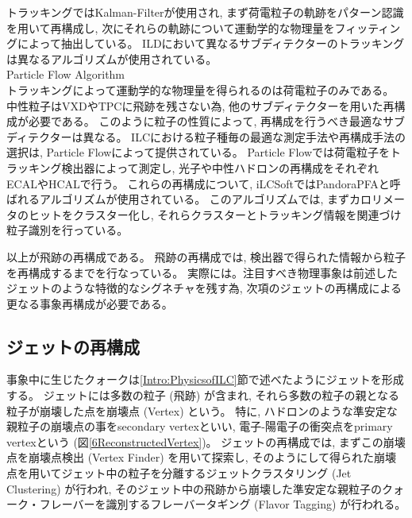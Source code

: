 トラッキングではKalman-Filterが使用され, まず荷電粒子の軌跡をパターン認識を用いて再構成し, 次にそれらの軌跡について運動学的な物理量をフィッティングによって抽出している。
ILDにおいて異なるサブディテクターのトラッキングは異なるアルゴリズムが使用されている。\\

Particle Flow Algorithm\\

トラッキングによって運動学的な物理量を得られるのは荷電粒子のみである。
中性粒子はVXDやTPCに飛跡を残さない為, 他のサブディテクターを用いた再構成が必要である。
このように粒子の性質によって, 再構成を行うべき最適なサブディテクターは異なる。
ILCにおける粒子種毎の最適な測定手法や再構成手法の選択は, Particle Flowによって提供されている。
Particle Flowでは荷電粒子をトラッキング検出器によって測定し, 光子や中性ハドロンの再構成をそれぞれECALやHCALで行う。
これらの再構成について, iLCSoftではPandoraPFAと呼ばれるアルゴリズムが使用されている。
このアルゴリズムでは, まずカロリメータのヒットをクラスター化し, それらクラスターとトラッキング情報を関連づけ粒子識別を行っている。

以上が飛跡の再構成である。
飛跡の再構成では, 検出器で得られた情報から粒子を再構成するまでを行なっている。
実際には。注目すべき物理事象は前述したジェットのような特徴的なシグネチャを残す為, 次項のジェットの再構成による更なる事象再構成が必要である。


\subsection{ジェットの再構成} \label{Intro:SoftERILC:JetReconstruction}

事象中に生じたクォークは\ref{Intro:PhysicsofILC}節で述べたようにジェットを形成する。
ジェットには多数の粒子 (飛跡) が含まれ, それら多数の粒子の親となる粒子が崩壊した点を崩壊点 (Vertex) という。
特に, ハドロンのような準安定な親粒子の崩壊点の事をsecondary vertexといい, 電子-陽電子の衝突点をprimary vertexという (図\ref{6ReconstructedVertex})。
ジェットの再構成では, まずこの崩壊点を崩壊点検出 (Vertex Finder) を用いて探索し, そのようにして得られた崩壊点を用いてジェット中の粒子を分離するジェットクラスタリング (Jet Clustering) が行われ, そのジェット中の飛跡から崩壊した準安定な親粒子のクォーク・フレーバーを識別するフレーバータギング (Flavor Tagging) が行われる。

